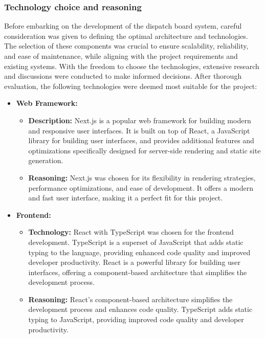 \documentclass[10pt]{article}
\begin{document}
        \subsubsection{Technology choice and reasoning}
        Before embarking on the development of the dispatch board system, careful consideration was given to defining the optimal architecture and technologies. The selection of these components was crucial to ensure scalability, reliability, and ease of maintenance, while aligning with the project requirements and existing systems.
        With the freedom to choose the technologies, extensive research and discussions were conducted to make informed decisions. After thorough evaluation, the following technologies were deemed most suitable for the project:
        \begin{itemize}
                \item \textbf{Web Framework:}
                \begin{itemize}
                    \item \textbf{Description:} Next.js is a popular web framework for building modern and responsive user interfaces. It is built on top of React, a JavaScript library for building user interfaces, and provides additional features and optimizations specifically designed for server-side rendering and static site generation.
                    \item \textbf{Reasoning:} Next.js was chosen for its flexibility in rendering strategies, performance optimizations, and ease of development. It offers a modern and fast user interface, making it a perfect fit for this project.
                \end{itemize}

                \item \textbf{Frontend:}
                \begin{itemize}
                    \item \textbf{Technology:} React with TypeScript was chosen for the frontend development. TypeScript is a superset of JavaScript that adds static typing to the language, providing enhanced code quality and improved developer productivity. React is a powerful library for building user interfaces, offering a component-based architecture that simplifies the development process.
                    \item \textbf{Reasoning:} React's component-based architecture simplifies the development process and enhances code quality. TypeScript adds static typing to JavaScript, providing improved code quality and developer productivity.
                \end{itemize}


\end{itemize}
\end{document}
